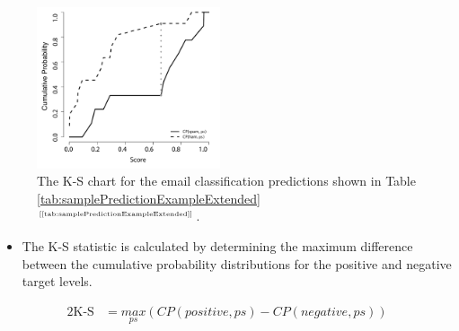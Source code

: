 \documentclass[xcolor={table}]{beamer}
\newcommand{\ourRef}[1]{\ref{#1} $^{\text{\tiny[\pageref{#1}]}}$}
\begin{document}
 \begin{frame} 
\begin{figure}[htb]
       \begin{centering}
			\includegraphics[width=0.48\textwidth]{images/Eval-KS-Curves.pdf}
       \caption{The K-S chart for the email classification predictions shown in Table \ourRef{tab:samplePredictionExampleExtended}.}
       \label{fig:ksCurveExample}
       \end{centering}
\end{figure}
\end{frame} 

 \begin{frame} 
  \begin{itemize}
 	\item The K-S statistic is calculated by determining the maximum difference between the cumulative probability distributions for the positive and negative target levels. 
\end{itemize}

\begin{alignat}{2}
\text{K-S} & =  \underset{ps}{max}\left(CP(positive, ps) - CP(negative, ps)\right) 
\end{alignat}
\end{frame} 
\end{document}

